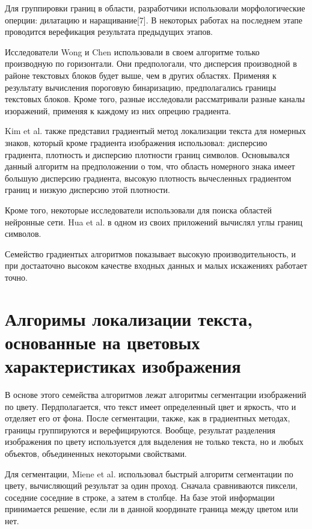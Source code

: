 \documentclass[oneside,final,14pt]{extreport}
\begin{document}
	Для группировки границ в области, разработчики использовали морфологические оперции: дилатацию и наращивание[7].  В некоторых работах на последнем этапе проводится верефикация результата предыдущих этапов.

Исследователи Wong и Chen использовали в своем алгоритме только производную по горизонтали. Они предпологали, что дисперсия производной в районе текстовых блоков будет выше, чем в других областях.  Применяя к результату вычисления пороговую бинаризацию, предполагались границы текстовых блоков.  Кроме того, разные исследовали рассматривали разные каналы изоражений, применяя к каждому из них опрецию градиента.

Kim et al. также представил градиентый метод локализации текста для номерных знаков, который кроме градиента изображения использовал: дисперсию градиента, плотность и дисперсию плотности границ символов. Основывался данный алгоритм на предположении о том, что область номерного знака имеет большую дисперсию градиента, высокую плотность вычесленных градиентом границ и низкую дисперсию этой плотности.

Кроме того, некоторые исследователи использовали для поиска областей нейронные сети.  Hua et al. в одном из своих приложений вычислял углы границ символов. 

Семейство градиентых алгоритмов показывает высокую производительность, и при достааточно высоком качестве входных данных и малых искажениях работает точно.

\section{Алгоримы локализации текста, основанные на цветовых характеристиках изображения}

 В основе этого семейства алгоритмов лежат алгоритмы сегментации изображений по цвету. Пердполагается, что текст имеет определенный цвет и яркость, что и отделяет его от фона.  После сегментации, также, как в градиентных методах, границы группируются и верефицируются. Вообще,  результат разделения изображения по цвету используется для выделения не только текста, но и любых объектов, объединенных некоторыми свойствами.

Для сегментации, Miene et al. использовал быстрый алгоритм сегментации по цвету, вычисляющий результат за один проход. Сначала сравниваются пиксели, соседние соседние в строке, а затем в столбце. На базе этой информации принимается решение, если ли в данной координате граница между цветом или нет.    
\end{document}
